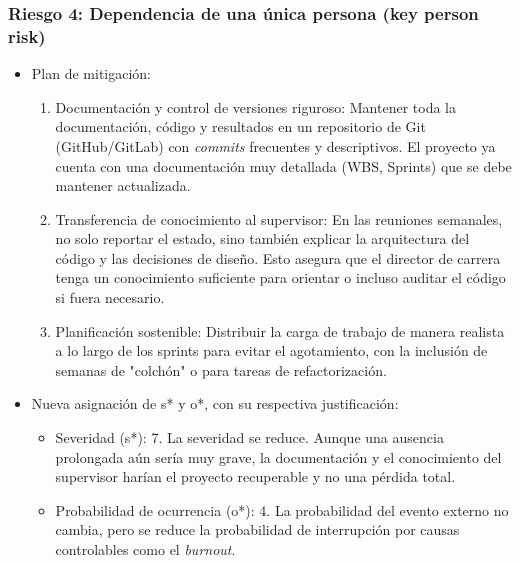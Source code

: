 \documentclass[
11pt, %
]{charter}
\begin{document}
\subsubsection*{Riesgo 4: Dependencia de una única persona (key person risk)}
\begin{itemize}
    \item Plan de mitigación:
    \begin{enumerate}
        \item Documentación y control de versiones riguroso: Mantener toda la documentación, código y resultados en un repositorio de Git (GitHub/GitLab) con \textit{commits} frecuentes y descriptivos. El proyecto ya cuenta con una documentación muy detallada (WBS, Sprints) que se debe mantener actualizada.
        \item Transferencia de conocimiento al supervisor: En las reuniones semanales, no solo reportar el estado, sino también explicar la arquitectura del código y las decisiones de diseño. Esto asegura que el director de carrera tenga un conocimiento suficiente para orientar o incluso auditar el código si fuera necesario.
        \item Planificación sostenible: Distribuir la carga de trabajo de manera realista a lo largo de los sprints para evitar el agotamiento, con la inclusión de semanas de "colchón" o para tareas de refactorización.
    \end{enumerate}
    \item Nueva asignación de s* y o*, con su respectiva justificación:
    \begin{itemize}
        \item Severidad (s*): 7. La severidad se reduce. Aunque una ausencia prolongada aún sería muy grave, la documentación y el conocimiento del supervisor harían el proyecto recuperable y no una pérdida total.
        \item Probabilidad de ocurrencia (o*): 4. La probabilidad del evento externo no cambia, pero se reduce la probabilidad de interrupción por causas controlables como el \textit{burnout}.
    \end{itemize}
\end{itemize}
\end{document}
